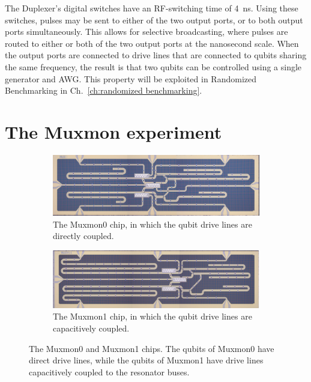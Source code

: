     \vspace{1cm}

      The Duplexer's digital switches have an RF-switching time of \SI{4}{\nano \second}. Using these switches, pulses may be sent to either of the two output ports, or to both output ports simultaneously. This allows for selective broadcasting, where pulses are routed to either or both of the two output ports at the nanosecond scale. When the output ports are connected to drive lines that are connected to qubits sharing the same frequency, the result is that two qubits can be controlled using a single generator and AWG. This property will be exploited in Randomized Benchmarking in Ch.~\ref{ch:randomized benchmarking}.

    \section{The Muxmon experiment}
      \label{sec: the Muxmon experiment}
      \begin{figure}[h]
      \centering
        \begin{subfigure}[b]{0.9\textwidth}
          \includegraphics[width=1\linewidth]{Figures/MUX_0.jpg}
          \caption{The Muxmon0 chip, in which the qubit drive lines are directly coupled.}
          \label{fig:Muxmon0 image}
        \end{subfigure}

        \begin{subfigure}[b]{0.9\textwidth}
          \includegraphics[width=1\linewidth]{Figures/MUX_1.jpg}
          \caption{The Muxmon1 chip, in which the qubit drive lines are capacitively coupled.}
          \label{fig:Muxmon1 image}
        \end{subfigure}
        \caption[Muxmon chips]{The Muxmon0 and Muxmon1 chips. The qubits of Muxmon0 have direct drive lines, while the qubits of Muxmon1 have drive lines capacitively coupled to the resonator buses.}
        \label{fig:Muxmon0 and Muxmon1}
      \end{figure}

